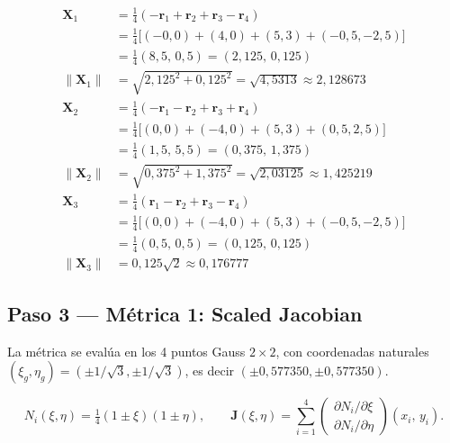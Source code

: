 \documentclass[11pt,a4paper]{article}
\begin{document}
\begin{stepbox}[title={C\'alculo de $\mathbf{X}_1$, $\mathbf{X}_2$, $\mathbf{X}_3$ seg\'un ec.~\eqref{eq:X123}}]
\begin{align*}
\mathbf{X}_1 &= \tfrac{1}{4}(-\mathbf{r}_1+\mathbf{r}_2+\mathbf{r}_3-\mathbf{r}_4) \\
&= \tfrac{1}{4}\bigl[(-0,0)+(4,0)+(5,3)+(-0{,}5,-2{,}5)\bigr] \\
&= \tfrac{1}{4}(8{,}5,\,0{,}5) = (2{,}125,\,0{,}125) \\
\|\mathbf{X}_1\| &= \sqrt{2{,}125^2+0{,}125^2} = \sqrt{4{,}5313} \approx 2{,}128673 \\[4pt]
\mathbf{X}_2 &= \tfrac{1}{4}(-\mathbf{r}_1-\mathbf{r}_2+\mathbf{r}_3+\mathbf{r}_4) \\
&= \tfrac{1}{4}\bigl[(0,0)+(-4,0)+(5,3)+(0{,}5,2{,}5)\bigr] \\
&= \tfrac{1}{4}(1{,}5,\,5{,}5) = (0{,}375,\,1{,}375) \\
\|\mathbf{X}_2\| &= \sqrt{0{,}375^2+1{,}375^2} = \sqrt{2{,}03125} \approx 1{,}425219 \\[4pt]
\mathbf{X}_3 &= \tfrac{1}{4}(\mathbf{r}_1-\mathbf{r}_2+\mathbf{r}_3-\mathbf{r}_4) \\
&= \tfrac{1}{4}\bigl[(0,0)+(-4,0)+(5,3)+(-0{,}5,-2{,}5)\bigr] \\
&= \tfrac{1}{4}(0{,}5,\,0{,}5) = (0{,}125,\,0{,}125) \\
\|\mathbf{X}_3\| &= 0{,}125\sqrt{2} \approx 0{,}176777
\end{align*}
\end{stepbox}

\subsection{Paso 3 --- M\'etrica 1: Scaled Jacobian}

La m\'etrica se eval\'ua en los 4 puntos Gauss $2\!\times\!2$, con coordenadas naturales $(\xi_g,\eta_g) = (\pm 1/\sqrt{3},\pm 1/\sqrt{3})$, es decir $(\pm 0{,}577350,\pm 0{,}577350)$.

\begin{stepbox}[title={Funciones de forma y Jacobiano Q4}]
\[
N_i(\xi,\eta) = \tfrac{1}{4}(1\pm\xi)(1\pm\eta),\qquad
\mathbf{J}(\xi,\eta) = \sum_{i=1}^{4}\begin{pmatrix}\partial N_i/\partial\xi \\ \partial N_i/\partial\eta\end{pmatrix}(x_i,\,y_i).
\]
\end{stepbox}
\end{document}
